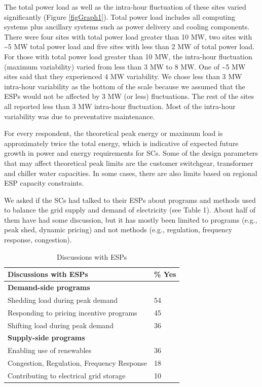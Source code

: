 The total power load as well as the intra-hour fluctuation of these sites
varied significantly (Figure \ref{figGraph1}). Total power load includes all computing systems plus ancillary systems such as power delivery and cooling components.
There were four sites with total power load greater
than 10 MW, two sites with \textasciitilde5 MW total power load and five
sites with less than 2 MW  of total power load. For those with total power load greater than 10 MW, the
intra-hour fluctuation (maximum variability) varied from less than 3 MW to 8 MW. One of
\textasciitilde 5 MW sites said that they experienced 4 MW variability. We chose less than 3 MW intra-hour variability as the bottom of the scale because we assumed that the
ESPs would not be affected by 3 MW (or less) 
fluctuations. The rest of the sites all reported less than 3 MW intra-hour fluctuation. Most of the intra-hour variability was due to preventative maintenance. 

For every respondent, the theoretical peak energy or maximum load is approximately twice the total energy, which is indicative of expected future growth in power and energy requirements for SCs. Some of the design parameters that may affect theoretical peak limits are the customer switchgear, transformer 
and chiller water capacities. In some cases, there are also limits based on regional ESP capacity constraints.

We asked if the SCs had talked to their ESPs about programs and methods used to balance the grid supply and demand of electricity (see Table 1). About half of them have had some discussion, but it
has mostly been limited to programs (e.g., peak shed, dynamic pricing) 
and not methods (e.g., regulation, frequency response, congestion).

\begin{table}[htbp]
\caption{Discussions with ESPs}
\begin{tabular}{|p{190pt}|l|}
\hline
\textbf{Discussions with ESPs}&
{\%} Yes \\
\hline
\textbf{Demand-side programs}&
~ \\
\hline
Shedding load during peak demand&
54 \\
\hline
Responding to pricing incentive programs&
45 \\
\hline
Shifting load during peak demand&
36 \\
\hline
\textbf{Supply-side programs}&
~ \\
\hline
Enabling use of renewables&
36 \\
\hline
Congestion, Regulation, Frequency Response&
18 \\
\hline
Contributing to electrical grid storage&
10 \\
\hline
\end{tabular}
\label{tab2}
\end{table}

